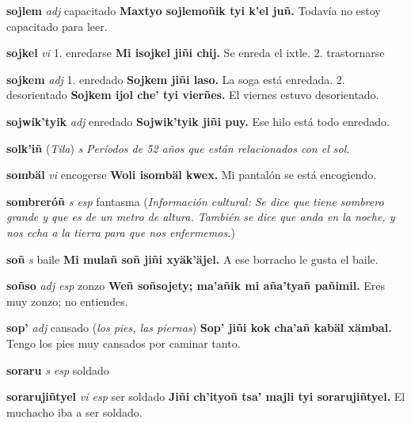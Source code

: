 \documentclass[10pt]{scrbook}
\newcommand{\entry}[1]{\textbf{#1}}
\newcommand{\onedefinition}[1]{#1.}
\newcommand{\nontranslationdef}[1]{\textit{#1}}
\newcommand{\partofspeech}[1]{\textit{#1}}
\newcommand{\spanishtranslation}[1]{#1}
\newcommand{\clarification}[1]{(\textit{#1})}
\newcommand{\cholexample}[1]{\textbf{#1}}
\newcommand{\exampletranslation}[1]{#1}
\newcommand{\relevantdialect}[1]{(\textit{#1})}
\newcommand{\culturalinformation}[1]{(\textit{#1})}
\begin{document}
\begin{multicols}{2}
\entry{sojlem}
\partofspeech{adj}
\spanishtranslation{capacitado}
\cholexample{Maxtyo sojlemoñik tyi k'el juñ.}
\exampletranslation{Todavía no estoy capacitado para leer.}

\entry{sojkel}
\partofspeech{vi}
\onedefinition{1}
\spanishtranslation{enredarse}
\cholexample{Mi isojkel jiñi chij.}
\exampletranslation{Se enreda el ixtle.}
\onedefinition{2}
\spanishtranslation{trastornarse}

\entry{sojkem}
\partofspeech{adj}
\onedefinition{1}
\spanishtranslation{enredado}
\cholexample{Sojkem jiñi laso.}
\exampletranslation{La soga está enredada.}
\onedefinition{2}
\spanishtranslation{desorientado}
\cholexample{Sojkem ijol che' tyi vierñes.}
\exampletranslation{El viernes estuvo desorientado.}

\entry{sojwik'tyik}
\partofspeech{adj}
\spanishtranslation{enredado}
\cholexample{Sojwik'tyik jiñi puy.}
\exampletranslation{Ese hilo está todo enredado.}

\entry{solk'iñ}
\relevantdialect{Tila}
\partofspeech{s}
\nontranslationdef{Períodos de 52 años que están relacionados con el sol.}

\entry{sombäl}
\partofspeech{vi}
\spanishtranslation{encogerse}
\cholexample{Woli isombäl kwex.}
\exampletranslation{Mi pantalón se está encogiendo.}

\entry{sombreróñ}
\partofspeech{s esp}
\spanishtranslation{fantasma}
\culturalinformation{Información cultural: Se dice que tiene sombrero grande y que es de un metro de altura. También se dice que anda en la noche, y nos echa a la tierra para que nos enfermemos.}

\entry{soñ}
\partofspeech{s}
\spanishtranslation{baile}
\cholexample{Mi mulañ soñ jiñi xyäk'äjel.}
\exampletranslation{A ese borracho le gusta el baile.}

\entry{soñso}
\partofspeech{adj esp}
\spanishtranslation{zonzo}
\cholexample{Weñ soñsojety; ma'añik mi aña'tyañ pañimil.}
\exampletranslation{Eres muy zonzo; no entiendes.}

\entry{sop'}
\partofspeech{adj}
\spanishtranslation{cansado}
\clarification{los pies, las piernas}
\cholexample{Sop' jiñi kok cha'añ kabäl xämbal.}
\exampletranslation{Tengo los pies muy cansados por caminar tanto.}

\entry{soraru}
\partofspeech{s esp}
\spanishtranslation{soldado}

\entry{sorarujiñtyel}
\partofspeech{vi esp}
\spanishtranslation{ser soldado}
\cholexample{Jiñi ch'ityoñ tsa' majli tyi sorarujiñtyel.}
\exampletranslation{El muchacho iba a ser soldado.}


\end{multicols}
\end{document}
